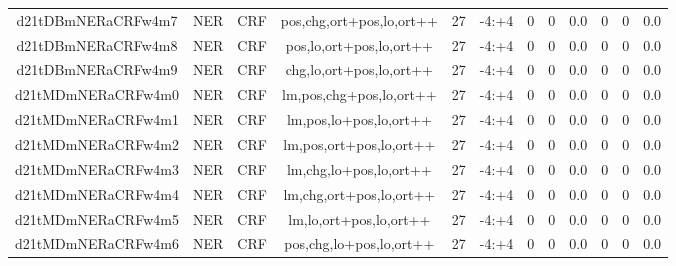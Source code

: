 \documentclass[a4paper]{article}
\begin{document}
\begin{landscape}
\begin{center}
\begin{tabular}{ |c|c|c|c|c|c|c|c|c|c|c|c|}
 
 	
 	\small{ d21tDBmNERaCRFw4m7 } & \small{ NER} & \small{  CRF }  & pos,chg,ort+pos,lo,ort++  &  27 &  \small{  -4:+4 }  &  0 & 0 & 0.0  &  0 & 0 & 0.0 \\
 	

 
 	
 	\small{ d21tDBmNERaCRFw4m8 } & \small{ NER} & \small{  CRF }  & pos,lo,ort+pos,lo,ort++  &  27 &  \small{  -4:+4 }  &  0 & 0 & 0.0  &  0 & 0 & 0.0 \\
 	

 
 	
 	\small{ d21tDBmNERaCRFw4m9 } & \small{ NER} & \small{  CRF }  & chg,lo,ort+pos,lo,ort++  &  27 &  \small{  -4:+4 }  &  0 & 0 & 0.0  &  0 & 0 & 0.0 \\
 	

 
 	
 	\small{ d21tMDmNERaCRFw4m0 } & \small{ NER} & \small{  CRF }  & lm,pos,chg+pos,lo,ort++  &  27 &  \small{  -4:+4 }  &  0 & 0 & 0.0  &  0 & 0 & 0.0 \\
 	

 
 	
 	\small{ d21tMDmNERaCRFw4m1 } & \small{ NER} & \small{  CRF }  & lm,pos,lo+pos,lo,ort++  &  27 &  \small{  -4:+4 }  &  0 & 0 & 0.0  &  0 & 0 & 0.0 \\
 	

 
 	
 	\small{ d21tMDmNERaCRFw4m2 } & \small{ NER} & \small{  CRF }  & lm,pos,ort+pos,lo,ort++  &  27 &  \small{  -4:+4 }  &  0 & 0 & 0.0  &  0 & 0 & 0.0 \\
 	

 
 	
 	\small{ d21tMDmNERaCRFw4m3 } & \small{ NER} & \small{  CRF }  & lm,chg,lo+pos,lo,ort++  &  27 &  \small{  -4:+4 }  &  0 & 0 & 0.0  &  0 & 0 & 0.0 \\
 	

 
 	
 	\small{ d21tMDmNERaCRFw4m4 } & \small{ NER} & \small{  CRF }  & lm,chg,ort+pos,lo,ort++  &  27 &  \small{  -4:+4 }  &  0 & 0 & 0.0  &  0 & 0 & 0.0 \\
 	

 
 	
 	\small{ d21tMDmNERaCRFw4m5 } & \small{ NER} & \small{  CRF }  & lm,lo,ort+pos,lo,ort++  &  27 &  \small{  -4:+4 }  &  0 & 0 & 0.0  &  0 & 0 & 0.0 \\
 	

 
 	
 	\small{ d21tMDmNERaCRFw4m6 } & \small{ NER} & \small{  CRF }  & pos,chg,lo+pos,lo,ort++  &  27 &  \small{  -4:+4 }  &  0 & 0 & 0.0  &  0 & 0 & 0.0 \\
 	


\end{tabular}
\end{center}
\end{landscape}
\end{document}
